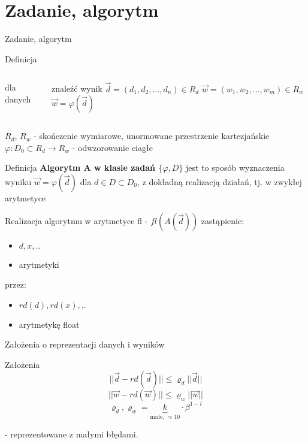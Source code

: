 \section{Zadanie, algorytm}
\begin{frame}{Zadanie, algorytm}
    \begin{block}{Definicja}
        \begin{columns}
                \hfill dla danych
                \newline

                \hfill znaleźć wynik
                $\vec{d} = \left( d_1, d_2, ..., d_n \right) \in R_d$\newline
                $\vec{w} = \left( w_1, w_2, ..., w_m \right) \in R_w$\newline
                $\vec{w} = \varphi(\vec{d})$
        \end{columns}
        $R_d$, $R_w$ - skończenie wymiarowe, unormowane przestrzenie kartezjańskie\newline
        $\varphi: D_0 \subset R_d \rightarrow R_w$ - odwzorowanie ciagłe
    \end{block}
    \begin{block}{Definicja}
        {\bf Algorytm A w klasie zadań $\{\varphi, D\}$} jest to sposób wyznaczenia wyniku $\vec{w} = \varphi(\vec{d})$ dla $d \in D \subset D_0$, z dokładną realizacją działań, tj. w zwykłej arytmetyce
    \end{block}
\end{frame}
\begin{frame}{Realizacja algorytmu w arytmetyce fl - $fl(A(\vec{d}))$}
    zastąpienie:
    \begin{itemize}
        \item $d, x, ..$
        \item arytmetyki
    \end{itemize}
    przez:
    \begin{itemize}
        \item $rd(d), rd(x), ..$
        \item arytmetykę float
    \end{itemize}
\end{frame}
\begin{frame}{Założenia o reprezentacji danych i wyników}
    \begin{block}{Założenia}
    \[
    || \vec{d} - rd(\vec{d}) ||
    \le 
    \varrho_d ||\vec{d} ||
    \] \[
    || \vec{w} - rd(\vec{w}) ||
    \le 
    \varrho_w ||\vec{w} ||
    \] \[
    \varrho_d, \varrho_w = \underbrace{k}_{\text{małe, } \approx 10} \cdot \beta^{1-t}
    \]
    \end{block}
    - reprezentowane z małymi błędami.
\end{frame}
